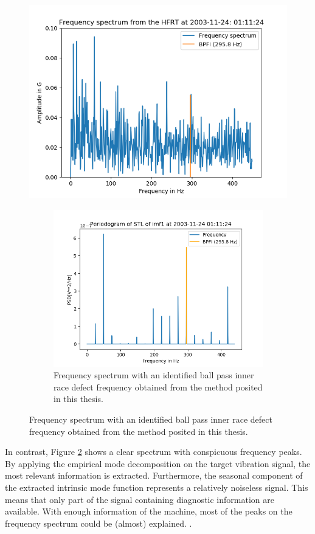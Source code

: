 \documentclass[../Main/thesis.tex]{subfiles}
\begin{document}
	\begin{figure}[H]
		\centering
		\includegraphics[width=0.7\linewidth]{../fig/hfrt}
		\caption{Frequency spectrum with an identified ball pass inner race defect frequency obtained from the high frequency resonance technique (HFRT).}
		\label{fig:hfrt-method}
		
		\begin{figure}[H]
			\centering
			\includegraphics[width=0.7\linewidth]{../fig/periodogram_bpfi/end_imf1_bpfi}
			\caption{Frequency spectrum with an identified ball pass inner race defect frequency obtained from the method posited in this thesis.}
			\label{fig:yapi-method}
		\end{figure}
	\end{figure}
\justify
In contrast, Figure \ref{fig:yapi-method} shows a clear spectrum with conspicuous frequency peaks. By applying the empirical mode decomposition on the target vibration signal, the most relevant information is extracted. Furthermore, the seasonal component of the extracted intrinsic mode function represents a relatively noiseless signal. This means that only part of the signal containing diagnostic information are available. With enough information of the machine, most of the peaks on the frequency spectrum could be (almost) explained. .
\end{document}
